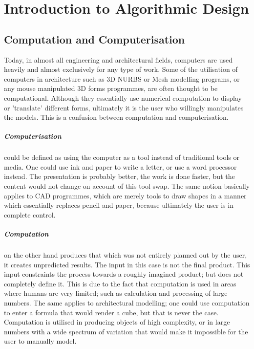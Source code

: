 \chapter{Introduction to Algorithmic Design}

\section{Computation and Computerisation}

Today, in almost all engineering and architectural fields, computers are used heavily and almost
exclusively for any type of work. Some of the utilisation of computers in architecture such as 3D
NURBS or Mesh modelling programs, or any mouse manipulated 3D forms programmes, are often thought to
be computational. Although they essentially use numerical computation to display or 'translate'
\cite{terzidis06} different forms, ultimately it is the user who willingly manipulates the models.
This is a confusion between computation and computerisation. 

\paragraph{Computerisation}could be defined as using the computer as a tool instead of traditional
tools or media. One could use ink and paper to write a letter, or use a word processor instead. The
presentation is probably better, the work is done faster, but the content would not change on
account of this tool swap. The same notion basically applies to CAD programmes, which are merely
tools to draw shapes in a manner which essentially replaces pencil and paper, because ultimately the
user is in complete control.

\paragraph{Computation}on the other hand produces that which was not entirely planned out by the
user, it creates unpredicted results. The input in this case is not the final product. This input constraints
the process towards a roughly imagined product; but does not completely define it. This is due to the
fact that computation is used in areas where humans are very limited; such as calculation and
processing of large numbers. The same applies to architectural modelling; one could use computation
to enter a formula that would render a cube, but that is never the case. Computation is utilised in
producing objects of high complexity, or in large numbers with a wide spectrum of variation that
would make it impossible for the user to manually model.

